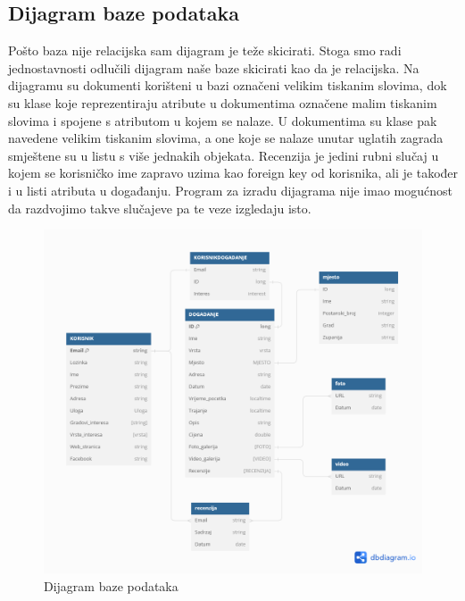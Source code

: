			\subsection{Dijagram baze podataka}
				Pošto baza nije relacijska sam dijagram je teže skicirati. Stoga smo radi jednostavnosti odlučili dijagram naše baze skicirati kao da je relacijska. Na dijagramu su dokumenti korišteni u bazi označeni velikim tiskanim slovima, dok su klase koje reprezentiraju atribute u dokumentima označene malim tiskanim slovima i spojene s atributom u kojem se nalaze. U dokumentima su klase pak navedene velikim tiskanim slovima, a one koje se nalaze unutar uglatih zagrada smještene su u listu s više jednakih objekata. Recenzija je jedini rubni slučaj u kojem se korisničko ime zapravo uzima kao foreign key od korisnika, ali je također i u listi atributa u događanju. Program za izradu dijagrama nije imao mogućnost da razdvojimo takve slučajeve pa te veze izgledaju isto.
				
				
		\begin{figure}[H]
			\includegraphics[width=\textwidth]{slike/Dijagram_baza.PNG} %
			\caption{Dijagram baze podataka}
			\label{fig:DB} %
		\end{figure}
			\eject
			
